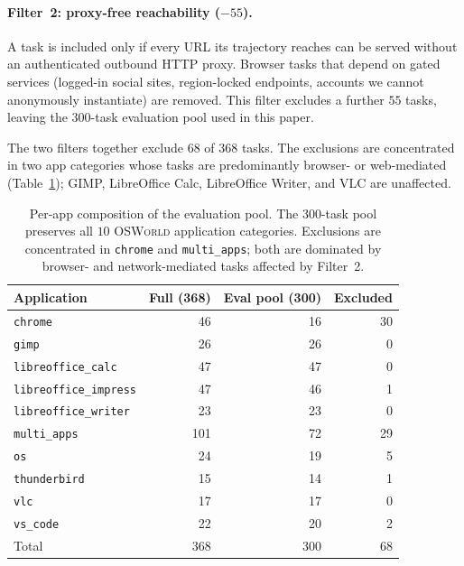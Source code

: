 \documentclass[11pt]{article}
\begin{document}
\paragraph{Filter~2: proxy-free reachability ($-55$).}
A task is included only if every URL its trajectory reaches can be served
without an authenticated outbound HTTP proxy. Browser tasks that depend on
gated services (logged-in social sites, region-locked endpoints, accounts
we cannot anonymously instantiate) are removed. This filter excludes a
further $55$ tasks, leaving the $300$-task evaluation pool used in this
paper.

The two filters together exclude $68$ of $368$ tasks. The exclusions are
concentrated in two app categories whose tasks are predominantly browser-
or web-mediated (Table~\ref{tab:eval-pool-breakdown}); GIMP, LibreOffice
Calc, LibreOffice Writer, and VLC are unaffected.

\begin{table}[h]
\centering
\caption{Per-app composition of the evaluation pool. The 300-task pool
preserves all $10$ \textsc{OSWorld} application categories. Exclusions are
concentrated in \texttt{chrome} and \texttt{multi\_apps}; both are
dominated by browser- and network-mediated tasks affected by Filter~2.}
\label{tab:eval-pool-breakdown}
\small
\begin{tabular}{lrrr}
\toprule
Application & Full (368) & Eval pool (300) & Excluded \\
\midrule
\texttt{chrome}              & 46  & 16  & 30 \\
\texttt{gimp}                & 26  & 26  & 0  \\
\texttt{libreoffice\_calc}    & 47  & 47  & 0  \\
\texttt{libreoffice\_impress} & 47  & 46  & 1  \\
\texttt{libreoffice\_writer}  & 23  & 23  & 0  \\
\texttt{multi\_apps}          & 101 & 72  & 29 \\
\texttt{os}                  & 24  & 19  & 5  \\
\texttt{thunderbird}         & 15  & 14  & 1  \\
\texttt{vlc}                 & 17  & 17  & 0  \\
\texttt{vs\_code}             & 22  & 20  & 2  \\
\midrule
Total                        & 368 & 300 & 68 \\
\bottomrule
\end{tabular}
\end{table}
\end{document}

